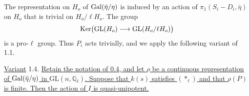 The representation on $H_o$ of $\operatorname{Gal}(\bar\eta/\eta)$ is induced by an action of $\pi_1(S_i-D_i,\bar\eta)$ on $H_o$ that is trivial on $H_o/\ell H_o$. The group
\[
\operatorname{Ker}\bigl(\mathrm{GL}(H_o)\longrightarrow\mathrm{GL}(H_o/\ell H_o)\bigr)
\]
is a pro-$\ell$ group. Thus $P_i$ acts trivially, and we apply the following variant of 1.1.

\underline{Variant} 1.4. \underline{Retain the notation of 0.4, and let $\rho$ be a continuous representation of $\operatorname{Gal}(\bar\eta/\eta)$ in $\mathrm{GL}(n,\mathbb{Q}_\ell)$. Suppose that $k(s)$ satisfies $(*_\ell)$ and that $\rho(P)$ is finite. Then the action of $I$ is quasi-unipotent.}
